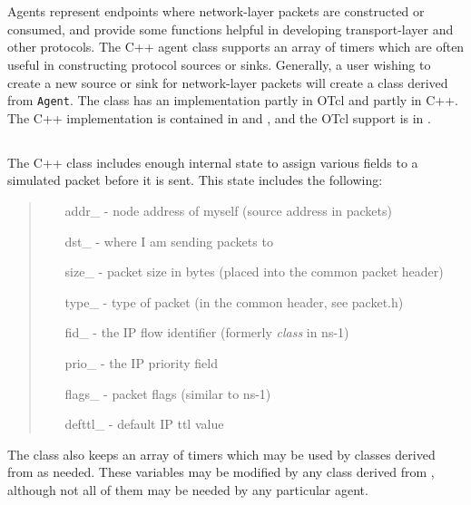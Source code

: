 %
%
\section{}

Agents represent endpoints where network-layer
packets are constructed or consumed, and provide
some functions helpful in developing transport-layer and other
protocols.
The C++ agent class supports an array of
timers which are often
useful in constructing protocol sources or sinks.
Generally, a user wishing to create a new
source or sink for network-layer packets
will create a class derived from {\tt Agent}.
The class  has an implementation partly in
OTcl and partly in C++.
The C++ implementation is contained in  and
, and the OTcl support is in
.

\subsection{}

The C++ class  includes enough internal state
to assign various fields to a simulated packet before
it is sent.
This state includes the following:
\begin{quote}
\begin{itemize}
        \item[addr\_] - node address of myself (source address in packets)
        \item[dst\_] - where I am sending packets to
        \item[size\_] - packet size in bytes (placed into the common packet header)
        \item[type\_] - type of packet (in the common header, see packet.h)
        \item[fid\_] - the IP flow identifier (formerly {\em class} in ns-1)
        \item[prio\_] - the IP priority field
	\item[flags\_] - packet flags (similar to ns-1)
	\item[defttl\_] - default IP ttl value
\end{itemize}
\end{quote}
The class also keeps an array of timers which may be used
by classes derived from  as needed.
These variables may be modified by any class derived from ,
although not all of them may be needed by any particular agent.

